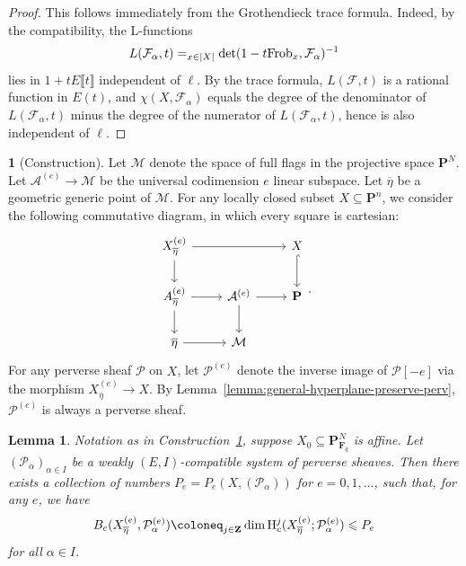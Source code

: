 \documentclass[english]{smfart}
\let\sum\relax\DeclareMathSymbol{\sum}{\mathop}{fourier}{80}
\let\prod\relax\DeclareMathSymbol{\prod}{\mathop}{fourier}{81}
\renewcommand{\mathbb}{\mathbf}
\renewcommand{\leq}{\leqslant}
\renewcommand{\subset}{\subseteq}
\theoremstyle{remark}
\theoremstyle{plain}
\newtheorem{lemma}[remark]{Lemma}
\theoremstyle{definition}
\numberwithin{equation}{remark}
\theoremstyle{void}
\newtheorem{situation}[remark]{}
\begin{document}
\begin{proof}
This follows immediately from the Grothendieck trace formula.  Indeed,
by the compatibility, the L-functions
\[
L(\mathcal{F}_{\alpha},t) = \prod_{x\in|X|}
\det(1-t\mathrm{Frob}_{x},\mathcal{F}_{\alpha})^{-1}
\]
lies in \(1+tE\llbracket{t}\rrbracket\) independent of \(\ell\).  By
the trace formula, \(L(\mathcal{F},t)\) is a rational function in
\(E(t)\), and \(\chi(X,\mathcal{F}_{\alpha})\) equals the degree
of the denominator of \(L(\mathcal{F}_{\alpha},t)\) minus the degree
of the numerator of \(L(\mathcal{F}_{\alpha},t)\), hence is also
independent of \(\ell\).
\end{proof}


\begin{situation}
[Construction]
\label{situation:flag-construction}
Let \(\mathcal{M}\) denote the space of full flags in the projective space
\(\mathbb{P}^{N}\).  Let \(\mathcal{A}^{(e)} \to \mathcal{M}\) be the
universal codimension \(e\) linear subspace.  Let \(\overline{\eta}\) be a
geometric generic point of \(\mathcal{M}\).  For any locally closed subset
\(X \subset \mathbb{P}^{n}\), we consider the following commutative diagram,
in which every square is cartesian:
\[
\begin{tikzcd}
X^{(e)}_{\overline{\eta}} \ar[rr] \ar[d] & &  X \ar[d,hook] \\
A^{(e)}_{\overline{\eta}} \ar[r] \ar[d] &
\mathcal{A}^{(e)} \ar[d] \ar[r] & \mathbb{P} \\
\overline{\eta} \ar[r] & \mathcal{M}
\end{tikzcd}.
\]
For any perverse sheaf \(\mathcal{P}\) on \(X\), let
\(\mathcal{P}^{(e)}\) denote the inverse image of \(\mathcal{P}[-e]\) via
the morphism \(X^{(e)}_{\overline{\eta}} \to X\).  By
Lemma~\ref{lemma:general-hyperplane-preserve-perv},
\(\mathcal{P}^{(e)}\) is always a perverse sheaf.
\end{situation}

\begin{lemma}\label{lemma:katz}
Notation as in Construction~\ref{situation:flag-construction},
suppose \(X_0 \subset \mathbb{P}^{N}_{\mathbb{F}_q}\) is affine.
Let \((\mathcal{P}_{\alpha})_{\alpha \in I}\) be a weakly
\((E, I)\)-compatible system of perverse sheaves.  Then there exists a
collection of numbers \(P_{e} = P_{e}(X, (\mathcal{P}_{\alpha}))\) for
\(e = 0, 1, \ldots\), such that, for any \(e\), we have
\[
B_{c}(X^{(e)}_{\overline{\eta}}, \mathcal{P}_{\alpha}^{(e)})
\coloneq
\sum_{j \in \mathbb{Z}}
\dim \mathrm{H}^{j}_{c}(X^{(e)}_{\overline{\eta}}; \mathcal{P}^{(e)}_{\alpha})
\leq P_{e}
\]
for all \(\alpha \in I\).
\end{lemma}
\end{document}

